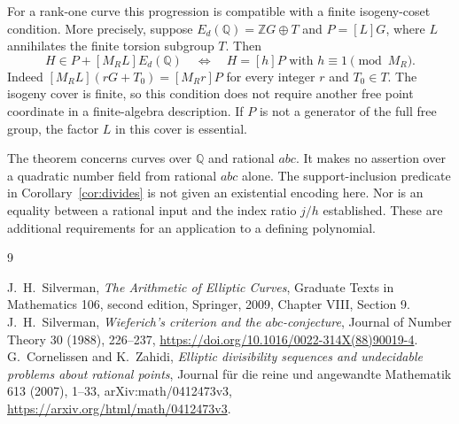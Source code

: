 \documentclass[11pt,a4paper]{article}
\newcommand{\Q}{\mathbb Q}\newcommand{\Z}{\mathbb Z}
\begin{document}
For a rank-one curve this progression is compatible with a
finite isogeny-coset condition. More precisely, suppose
$E_d(\Q)=\Z G\oplus T$ and $P=[L]G$, where $L$ annihilates
the finite torsion subgroup $T$. Then
\[
       H\in P+[M_RL]E_d(\Q)
       \quad\Longleftrightarrow\quad
       H=[h]P\text{ with }h\equiv1\pmod{M_R}.
\]
Indeed $[M_RL](rG+T_0)=[M_Rr]P$ for every integer $r$ and
$T_0\in T$. The isogeny cover is finite, so this condition
does not require another free point coordinate in a finite-algebra
description. If $P$ is not a generator of the full free group,
the factor $L$ in this cover is essential.

The theorem concerns curves over $\Q$ and rational $abc$.
It makes no assertion over a quadratic number field from rational
$abc$ alone. The support-inclusion predicate in Corollary~\ref{cor:divides}
is not given an existential encoding here. Nor is an equality between
a rational input and the index ratio $j/h$ established. These are
additional requirements for an application to a defining polynomial.

\begin{thebibliography}{9}\raggedright
{}J.~H.~Silverman, \emph{The Arithmetic of Elliptic Curves},
Graduate Texts in Mathematics 106, second edition, Springer, 2009,
Chapter VIII, Section 9.
J.~H.~Silverman,
\emph{Wieferich's criterion and the $abc$-conjecture},
Journal of Number Theory 30 (1988), 226--237,
\url{https://doi.org/10.1016/0022-314X(88)90019-4}.
G.~Cornelissen and K.~Zahidi,
\emph{Elliptic divisibility sequences and undecidable problems about
rational points}, Journal f\"ur die reine und angewandte Mathematik
613 (2007), 1--33, arXiv:math/0412473v3,
\url{https://arxiv.org/html/math/0412473v3}.
\end{thebibliography}
\end{document}

